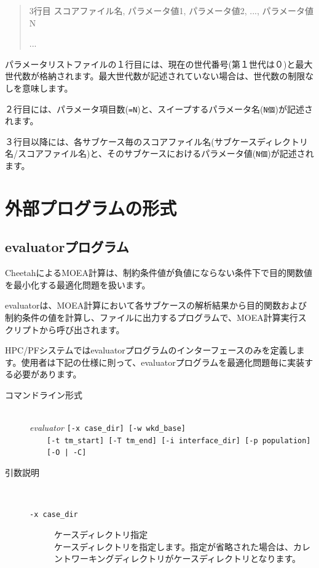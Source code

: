 \documentclass[a4paper,11pt]{jarticle}
\begin{document}
{\begin{tt}
\begin{quote}
3行目 スコアファイル名,  パラメータ値1,  パラメータ値2, ...,  パラメータ値N

...

\end{quote}
\end{tt}

パラメータリストファイルの１行目には、現在の世代番号(第１世代は０)と最大世代数が格納されます。最大世代数が記述されていない場合は、世代数の制限なしを意味します。

２行目には、パラメータ項目数({\tt =N})と、スイープするパラメータ名({\tt N個})が記述されます。

３行目以降には、各サブケース毎のスコアファイル名(サブケースディレクトリ名/スコアファイル名)と、そのサブケースにおけるパラメータ値({\tt N個})が記述されます。


\newpage
\section{外部プログラムの形式}

\subsection{evaluatorプログラム}

CheetahによるMOEA計算は、制約条件値が負値にならない条件下で目的関数値を最小化する最適化問題を扱います。

evaluatorは、MOEA計算において各サブケースの解析結果から目的関数および制約条件の値を計算し、ファイルに出力するプログラムで、MOEA計算実行スクリプトから呼び出されます。

HPC/PFシステムではevaluatorプログラムのインターフェースのみを定義します。使用者は下記の仕様に則って、evaluatorプログラムを最適化問題毎に実装する必要があります。

\begin{description}
\item[コマンドライン形式] {\ }\\
\textit{evaluator} {\tt [-x case\_dir] [-w wkd\_base]}\\
\ \ \ \ {\tt [-t tm\_start] [-T tm\_end] [-i interface\_dir] [-p population]}\\
\ \ \ \ {\tt [-O | -C]}

\item[引数説明] {\ }\par
\begin{description}
\item[{\tt -x  case\_dir}] ケースディレクトリ指定\\
ケースディレクトリを指定します。指定が省略された場合は、カレントワーキングディレクトリがケースディレクトリとなります。\\


\end{description}
\end{description}}
\end{document}

